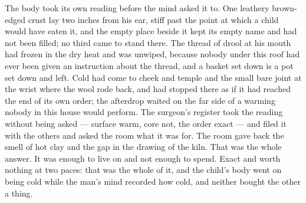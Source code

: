 \scenebreak

The body took its own reading before the mind asked it to. One leathery brown-edged crust lay two inches from his ear, stiff past the point at which a child would have eaten it, and the empty place beside it kept its empty name and had not been filled; no third came to stand there. The thread of drool at his mouth had frozen in the dry heat and was unwiped, because nobody under this roof had ever been given an instruction about the thread, and a basket set down is a pot set down and left. Cold had come to cheek and temple and the small bare joint at the wrist where the wool rode back, and had stopped there as if it had reached the end of its own order; the afterdrop waited on the far side of a warming nobody in this house would perform. The surgeon's register took the reading without being asked --- surface warm, core not, the order exact --- and filed it with the others and asked the room what it was for. The room gave back the smell of hot clay and the gap in the drawing of the kiln. That was the whole answer. It was enough to live on and not enough to spend. Exact and worth nothing at two paces: that was the whole of it, and the child's body went on being cold while the man's mind recorded how cold, and neither bought the other a thing.

